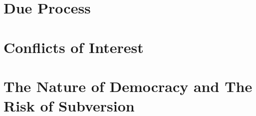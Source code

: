 \documentclass[10pt,titlepage]{book}
\begin{document}
\section{Due Process}

\section{Conflicts of Interest}

\section{The Nature of Democracy and The Risk of Subversion}

{}








\end{document}
